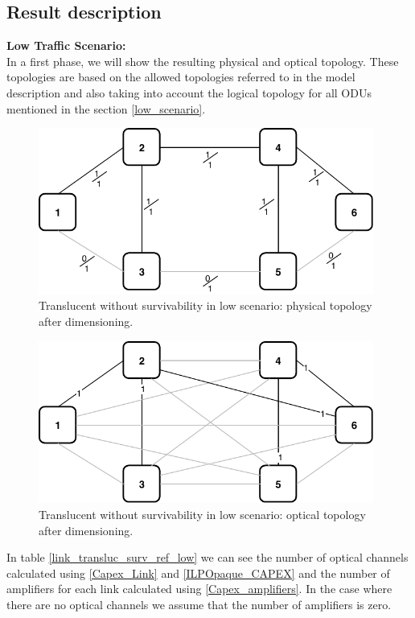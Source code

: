 \subsection{Result description}

\textbf{Low Traffic Scenario:}\\

In a first phase, we will show the resulting physical and optical topology. These topologies are based on the allowed topologies referred to in the model description and also taking into account the logical topology for all ODUs mentioned in the section \ref{low_scenario}.\\

\begin{figure}[h!]
\centering
\includegraphics[width=11cm]{sdf/ilp/translucent_survivability/figures/physical_topology_low}
\caption{Translucent without survivability in low scenario: physical topology after dimensioning.}
\label{physical3_low}
\end{figure}

\begin{figure}[h!]
\centering
\includegraphics[width=11cm]{sdf/ilp/translucent_survivability/figures/optical_topology_low}
\caption{Translucent without survivability in low scenario: optical topology after dimensioning.}
\label{optical3_low}
\end{figure}

In table \ref{link_transluc_surv_ref_low} we can see the number of optical channels calculated using \ref{Capex_Link} and \ref{ILPOpaque_CAPEX} and the number of amplifiers for each link calculated using \ref{Capex_amplifiers}. In the case where there are no optical channels we assume that the number of amplifiers is zero.\\

